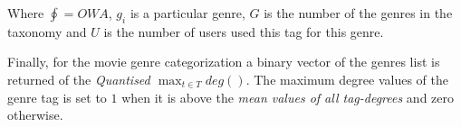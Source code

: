 Where $\oint=OWA$,  $g_{i}$ is a particular genre, $G$ is the number of the genres in the taxonomy and $U$ is the number of users used this tag for this genre.

Finally, for the movie genre categorization a binary vector of the genres list is returned of the \textit{Quantised  $\max_{t \in T} deg()$}. The maximum degree values of the genre tag is set to $1$ when it is above the \textit{mean values of all tag-degrees} and zero otherwise.






